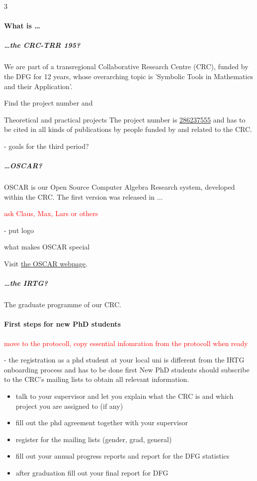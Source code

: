 \begin{multicols}{3} %
	\paragraph{What is \dots}
    
    \subparagraph{\dots the CRC-TRR 195?}
    We are part of a transregional Collaborative Research Centre (CRC), funded by the DFG for 12 years, whose overarching topic is 'Symbolic Tools in Mathematics and their Application'. 
    
    Find the project number and 
    
    Theoretical and practical projects The project number is \href{https://gepris.dfg.de/gepris/projekt/286237555}{286237555} and has to be cited in all kinds of publications by people funded by and related to the CRC.


    - goals for the third period?
    
    \subparagraph{\dots OSCAR?}
    OSCAR is our Open Source Computer Algebra Research system, developed within the CRC. The first version was released in ...
    
    \textcolor{red}{ask Claus, Max, Lars or others}
    
    - put logo

    what makes OSCAR special

    
    Visit \href{https://oscar-system.org}{the OSCAR webpage}.

    
    \subparagraph{\dots the IRTG?} 
   The graduate programme of our CRC.

    
    \paragraph{First steps for new PhD students} \textcolor{red}{move to the protocoll, copy essential infomration from the protocoll when ready}
    
        - the registration as a phd student at your local uni is different from the IRTG onboarding process and has to be done first
           New PhD students should subscribe to the CRC's mailing lists to obtain all relevant information. 
        \begin{itemize}
            \item  talk to your supervisor and let you explain what the CRC is and  which project you are assigned to (if any)
            \item fill out the phd agreement together with your supervisor
            \item  register for the mailing lists (gender, grad, general)
            \item  fill out your annual progress reports and report for the DFG statistics
            \item after graduation fill out your final report for DFG
        \end{itemize}
       

\end{multicols}
